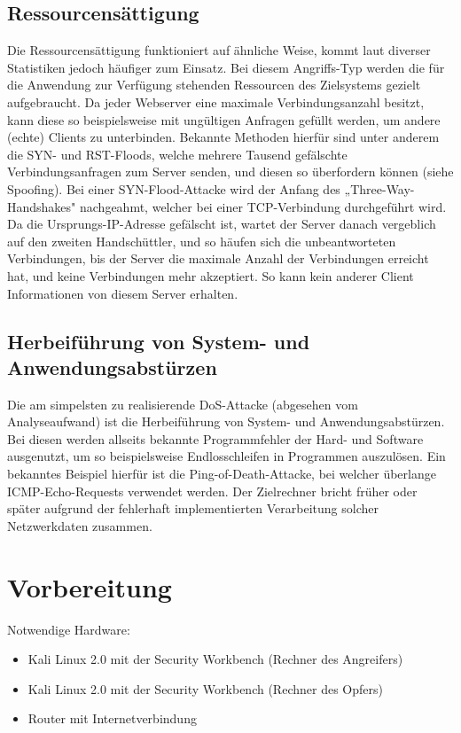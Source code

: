 \subsection{Ressourcensättigung}
Die Ressourcensättigung funktioniert auf ähnliche Weise, kommt laut diverser Statistiken jedoch häufiger zum Einsatz. Bei diesem Angriffs-Typ werden die für die Anwendung zur Verfügung stehenden Ressourcen des Zielsystems gezielt aufgebraucht. Da jeder Webserver eine maximale Verbindungsanzahl besitzt, kann diese so beispielsweise mit ungültigen Anfragen gefüllt werden, um andere (echte) Clients zu unterbinden. Bekannte Methoden hierfür sind unter anderem die SYN- und RST-Floods, welche mehrere Tausend gefälschte Verbindungsanfragen zum Server senden, und diesen so überfordern können (siehe Spoofing). Bei einer SYN-Flood-Attacke wird der Anfang des „Three-Way- Handshakes" nachgeahmt, welcher bei einer TCP-Verbindung durchgeführt wird. Da die Ursprungs-IP-Adresse gefälscht ist, wartet der Server danach vergeblich auf den zweiten Handschüttler, und so häufen sich die unbeantworteten Verbindungen, bis der Server die maximale Anzahl der Verbindungen erreicht hat, und keine Verbindungen mehr akzeptiert. So kann kein anderer Client Informationen von diesem Server erhalten.

\subsection{Herbeiführung von System- und Anwendungsabstürzen}
Die am simpelsten zu realisierende DoS-Attacke (abgesehen vom Analyseaufwand) ist die Herbeiführung von System- und Anwendungsabstürzen. Bei diesen werden allseits bekannte Programmfehler der Hard- und Software ausgenutzt, um so beispielsweise Endlosschleifen in Programmen auszulösen. Ein bekanntes Beispiel hierfür ist die Ping-of-Death-Attacke, bei welcher überlange ICMP-Echo-Requests verwendet werden. Der Zielrechner bricht früher oder später aufgrund der fehlerhaft implementierten Verarbeitung solcher Netzwerkdaten zusammen.

\section{Vorbereitung}
Notwendige Hardware:

\begin{itemize}
	\item Kali Linux 2.0 mit der Security Workbench (Rechner des Angreifers)
	\item Kali Linux 2.0 mit der Security Workbench (Rechner des Opfers)
	\item Router mit Internetverbindung
\end{itemize}

